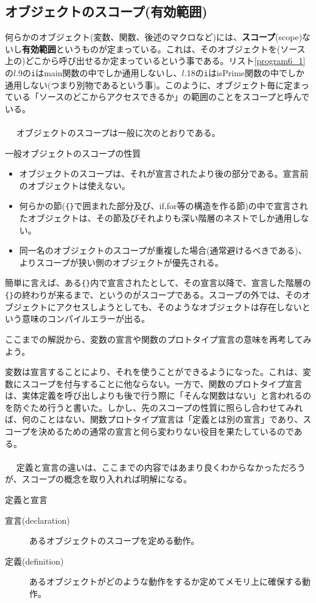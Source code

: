 \subsection{オブジェクトのスコープ(有効範囲)}
何らかのオブジェクト(変数、関数、後述のマクロなど)には、\textbf{スコープ}(scope)ないし\textbf{有効範囲}というものが定まっている。これは、そのオブジェクトを(ソース上の)どこから呼び出せるか定まっているという事である。リスト\ref{program6_1}の$l$.9の\verb|i|はmain関数の中でしか通用しないし、$l$.18の\verb|i|はisPrime関数の中でしか通用しない(つまり別物であるという事)。このように、オブジェクト毎に定まっている「ソースのどこからアクセスできるか」の範囲のことをスコープと呼んでいる。
\\ \\　
オブジェクトのスコープは一般に次のとおりである。
\begin{itembox}[l]{一般オブジェクトのスコープの性質}
\begin{itemize}
\item オブジェクトのスコープは、それが宣言されたより後の部分である。宣言前のオブジェクトは使えない。
\item 何らかの節(\verb|{}|で囲まれた部分及び、if,for等の構造を作る節)の中で宣言されたオブジェクトは、その節及びそれよりも深い階層のネストでしか通用しない。
\item 同一名のオブジェクトのスコープが重複した場合(通常避けるべきである)、よりスコープが狭い側のオブジェクトが優先される。
\end{itemize}
\end{itembox}

簡単に言えば、ある\verb|{}|内で宣言されたとして、その宣言以降で、宣言した階層の\verb|{}|の終わりが来るまで、というのがスコープである。スコープの外では、そのオブジェクトにアクセスしようとしても、そのようなオブジェクトは存在しないという意味のコンパイルエラーが出る。

ここまでの解説から、変数の宣言や関数のプロトタイプ宣言の意味を再考してみよう。

変数は宣言することにより、それを使うことができるようになった。これは、変数にスコープを付与することに他ならない。一方で、関数のプロトタイプ宣言は、実体定義を呼び出しよりも後で行う際に「そんな関数はない」と言われるのを防ぐため行うと書いた。しかし、先のスコープの性質に照らし合わせてみれば、何のことはない、関数プロトタイプ宣言は「定義とは別の宣言」であり、スコープを決めるための通常の宣言と何ら変わりない役目を果たしているのである。
\\ \\　
定義と宣言の違いは、ここまでの内容ではあまり良くわからなかっただろうが、スコープの概念を取り入れれば明解になる。
\begin{itembox}[l]{定義と宣言}
\begin{description}
\item[宣言(declaration)] あるオブジェクトのスコープを定める動作。
\item[定義(definition)] あるオブジェクトがどのような動作をするか定めてメモリ上に確保する動作。
\end{description}
\end{itembox}

